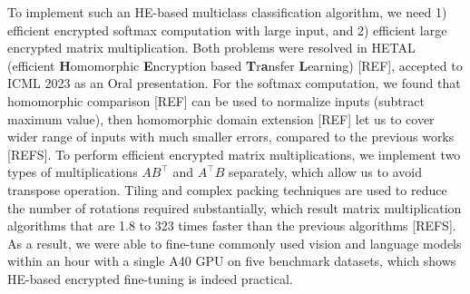 \documentclass[12pt]{article}
\begin{document}
To implement such an HE-based multiclass classification algorithm, we need 1) efficient encrypted softmax computation with large input, and 2) efficient large encrypted matrix multiplication.
Both problems were resolved in HETAL (efficient \textbf{H}omomorphic \textbf{E}ncryption based \textbf{T}r\textbf{a}nsfer \textbf{L}earning) [REF], accepted to ICML 2023 as an Oral presentation.
For the softmax computation, we found that homomorphic comparison [REF] can be used to normalize inputs (subtract maximum value), then homomorphic domain extension [REF] let us to cover wider range of inputs with much smaller errors, compared to the previous works [REFS].
To perform efficient encrypted matrix multiplications, we implement two types of multiplications $A B^\intercal$ and $A^\intercal B$ separately, which allow us to avoid transpose operation.
Tiling and complex packing techniques are used to reduce the number of rotations required substantially, which result matrix multiplication algorithms that are 1.8 to 323 times faster than the previous algorithms [REFS].
As a result, we were able to fine-tune commonly used vision and language models within an hour with a single A40 GPU on five benchmark datasets, which shows HE-based encrypted fine-tuning is indeed practical.




{
\scriptsize
}
\end{document}
